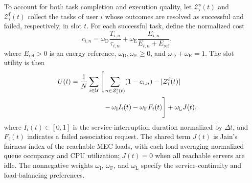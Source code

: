 \documentclass[journal]{IEEEtran}
\begin{document}
To account for both task completion and execution quality,
let $\mathcal{Z}_i^{\mathrm{s}}(t)$ and
$\mathcal{Z}_i^{\mathrm{f}}(t)$ collect the tasks of user $i$
whose outcomes are resolved as successful and failed,
respectively, in slot $t$.
For each successful task, define the normalized cost
\begin{equation}
c_{i,n}
=
\omega_{\mathrm D}\frac{T_{i,n}}{\tau_{i,n}}
+
\omega_{\mathrm E}
\frac{E_{i,n}}{E_{i,n}+E_{\mathrm{ref}}},
\label{eq:normalized_task_cost}
\end{equation}
where $E_{\mathrm{ref}}>0$ is an energy reference,
$\omega_{\mathrm D},\omega_{\mathrm E}\geq0$, and
$\omega_{\mathrm D}+\omega_{\mathrm E}=1$.
The slot utility is then
\begin{equation}
\begin{aligned}
U(t)
={}&\frac{1}{N}\sum_{i\in\mathcal{U}}
\Bigg[
\sum_{n\in\mathcal{Z}_i^{\mathrm{s}}(t)}
(1-c_{i,n})
-
|\mathcal{Z}_i^{\mathrm{f}}(t)|\\
&\hspace{12mm}
-\omega_{\mathrm I}I_i(t)
-\omega_{\mathrm F}F_i(t)
\Bigg]
+\omega_{\mathrm L}J(t),
\end{aligned}
\label{eq:network_service_utility}
\end{equation}
where $I_i(t)\in[0,1]$ is the service-interruption duration
normalized by $\Delta t$, and $F_i(t)$ indicates a failed
association request.
The shared term $J(t)$ is Jain's fairness index of the
reachable MEC loads, with each load averaging normalized
queue occupancy and CPU utilization; $J(t)=0$ when all
reachable servers are idle.
The nonnegative weights
$\omega_{\mathrm I}$, $\omega_{\mathrm F}$, and
$\omega_{\mathrm L}$ specify the service-continuity and
load-balancing preferences.
\end{document}
